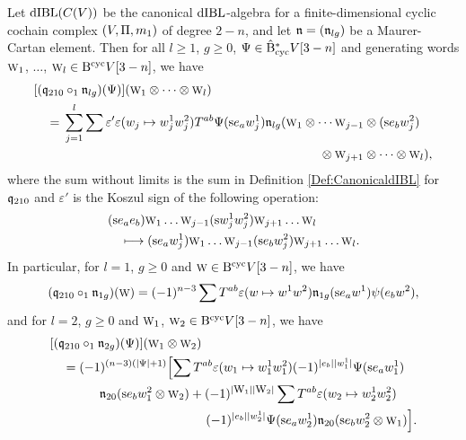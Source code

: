 \documentclass[\MainFolder/Text.tex]{subfiles}
\begin{document}

\begin{Proposition}\label{Prop:Formulafortwisted}
Let $\mathrm{dIBL}(C(V))$ be the canonical $\mathrm{dIBL}$-algebra for a finite-dimensional cyclic cochain complex $(V,\Pi,m_1)$ of degree $2-n$, and let $\mathfrak{n}=(\mathfrak{n}_{lg})$ be a Maurer-Cartan element. Then for all $l\ge 1$, $g\ge 0$, $\Psi\in \hat{\mathrm{B}}_{\mathrm{cyc}}^* V[3-n]$ and generating words $\text{\footnotesize W}_1$, $\dotsc$, $\text{\footnotesize W}_l \in \mathrm{B}^{\mathrm{cyc}} V [3-n]$, we have 
\begin{equation}\label{Eq:TwisteddIBL}
\begin{aligned}
& [(\OPQ_{210}\circ_1 \PMC_{lg})(\Psi)](\W_1 \otimes \dotsb \otimes \W_l) \\ 
& \quad = \begin{multlined}[t]\sum_{j=1}^l \sum \varepsilon' \varepsilon(w_j \mapsto w_j^1 w_j^2) T^{ab} \Psi(\Susp e_a w_j^1) \PMC_{lg}(\W_1 \otimes \dotsb \W_{j-1} \otimes (\Susp e_b w_j^2)  \\ \otimes \W_{j+1} \otimes \dotsb \otimes \W_l), \end{multlined}
\end{aligned}
\end{equation}
where the sum without limits is the sum in Definition \ref{Def:CanonicaldIBL} for $\mathfrak{q}_{210}$ and $\varepsilon'$ is the Koszul sign of the following operation:
$$\begin{multlined}(\Susp e_a e_b) \W_1 \dots \W_{j-1}(\Susp w_j^1 w_j^2) \W_{j+1} \dots \W_l \\ 
\longmapsto (\Susp e_a w_j^1) \W_1 \dots \W_{j-1} (\Susp e_b w_j^2)\W_{j+1} \dots \W_l.\end{multlined}$$
In particular, for $l=1$, $g\ge 0$ and $\text{\footnotesize W}\in \mathrm{B}^{\mathrm{cyc}} V[3-n]$, we have 
\begin{equation}\label{Eq:TwistDif}
(\mathfrak{q}_{210} \circ_1 \mathfrak{n}_{1g})(\text{\footnotesize W})= (-1)^{n-3} \sum T^{ab} \varepsilon(w \mapsto w^1 w^2) \mathfrak{n}_{1g}(\mathrm{s} e_a w^1)\psi(e_b w^2),
\end{equation}
and for $l=2$, $g\ge 0$ and $\text{\footnotesize W}_1$, $\text{\footnotesize W}_2\in \mathrm{B}^{\mathrm{cyc}} V[3-n]$, we have
\begin{equation}\label{Eq:Twistn2}
\begin{aligned}
 & [(\OPQ_{210}\circ_1 \PMC_{2g})(\Psi)](\W_1 \otimes \W_2) \\
 &\quad = \begin{multlined}[t](-1)^{(n-3)(\Abs{\Psi} + 1)} \Bigl[ \sum T^{ab} \varepsilon(w_1 \mapsto w_1^1w_{1}^{2}) (-1)^{\Abs{e_b}\Abs{w_1^1}}\Psi(\Susp e_a w_1^1)  \\ \PMC_{20}(\Susp e_b w_1^2 \otimes \W_2) + (-1)^{\Abs{\W_1}\Abs{\W_2}}\sum T^{ab}  \varepsilon(w_2\mapsto w_2^1w_2^2) \\ (-1)^{\Abs{e_b}\Abs{w_2^1}} \Psi(\Susp e_a w_2^1)\PMC_{20}(\Susp e_b w_2^2 \otimes \W_1)\Bigr].\end{multlined} \end{aligned}
\end{equation}
\end{Proposition}
\end{document}
